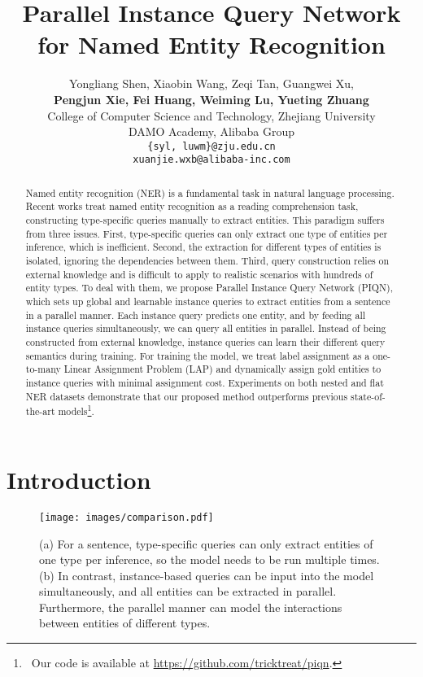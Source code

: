 \documentclass[11pt]{article}
\title{Parallel Instance Query Network for Named Entity Recognition}
\author{
Yongliang Shen, Xiaobin Wang, Zeqi Tan, Guangwei Xu,\\ 
\textbf{Pengjun Xie, Fei Huang, Weiming Lu, Yueting Zhuang}\\
College of Computer Science and Technology, Zhejiang University \\
 DAMO Academy, Alibaba Group\\
 \texttt{\{syl, luwm\}@zju.edu.cn}\\
\texttt{xuanjie.wxb@alibaba-inc.com}
}
\begin{document}
\maketitle
\renewcommand{\thefootnote}{\fnsymbol{footnote}}
\renewcommand{\thefootnote}{\arabic{footnote}}
\begin{abstract}



Named entity recognition (NER) is a fundamental task in natural language processing. Recent works treat named entity recognition as a reading comprehension task, constructing type-specific queries manually to extract entities. This paradigm suffers from three issues. First, type-specific queries can only extract one type of entities per inference, which is inefficient. Second, the extraction for different types of entities is isolated, ignoring the dependencies between them. Third, query construction relies on external knowledge and is difficult to apply to realistic scenarios with hundreds of entity types. To deal with them, we propose Parallel Instance Query Network (PIQN), which sets up global and learnable instance queries to extract entities from a sentence in a parallel manner. Each instance query predicts one entity, and by feeding all instance queries simultaneously, we can query all entities in parallel. Instead of being constructed from external knowledge, instance queries can learn their different query semantics during training. For training the model, we treat label assignment as a one-to-many Linear Assignment Problem (LAP) and dynamically assign gold entities to instance queries with minimal assignment cost. Experiments on both nested and flat NER datasets demonstrate that our proposed method outperforms previous state-of-the-art models\footnote{\ Our code is available at \url{https://github.com/tricktreat/piqn}.}.
\end{abstract}

\section{Introduction}

\begin{figure}[t!]
  \centering
  \texttt{[image: images/comparison.pdf]}
  \caption{(a) For a sentence, type-specific queries can only extract entities of one type per inference, so the model needs to be run multiple times. (b) In contrast, instance-based queries can be input into the model simultaneously, and all entities can be extracted in parallel. Furthermore, the parallel manner can model the interactions between entities of different types.}
\label{fig:example}
\end{figure}
\end{document}
